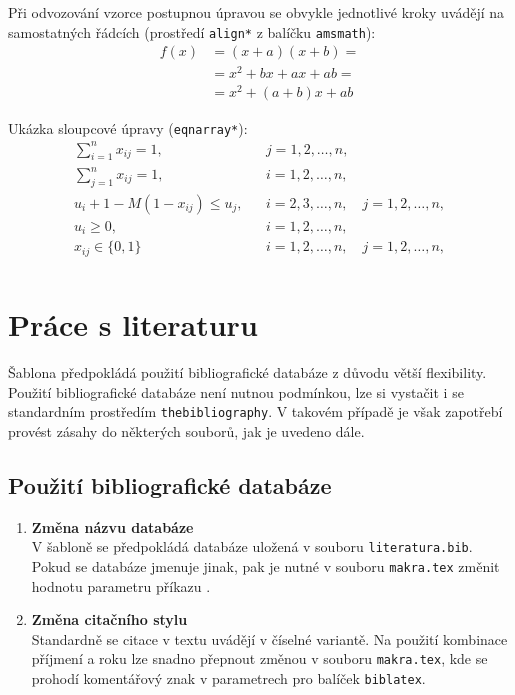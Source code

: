 Při odvozování vzorce postupnou úpravou se obvykle jednotlivé kroky uvádějí na samostatných řádcích (prostředí \verb'align*' z balíčku \verb|amsmath|):
\begin{align*}
 f(x) &= (x+a)(x+b) =\\
      &= x^2 + bx + ax + ab =\\
      &= x^2 + (a+b)x + ab
\end{align*}

Ukázka sloupcové úpravy (\verb|eqnarray*|):
\begin{eqnarray*}
\sum_{i=1}^n x_{ij} =1, && j=1,2,\dots,n,\\
\sum_{j=1}^n x_{ij} =1, && i=1,2,\dots,n,\\
u_i + 1 - M(1 - x_{ij}) \le u_j, && i=2,3,\dots,n,\quad j=1,2,\dots,n,\\
u_i \ge 0,              && i=1,2,\dots,n,\\
x_{ij} \in \{0,1\} && i=1,2,\dots,n,\quad j=1,2,\dots,n,\\
\end{eqnarray*}


\chapter{Práce s literaturu}

Šablona předpokládá použití bibliografické databáze z důvodu větší flexibility. Použití bibliografické databáze není nutnou podmínkou, lze si vystačit i se standardním prostředím \texttt{thebibliography}. V takovém případě je však zapotřebí provést zásahy do některých souborů, jak je uvedeno dále.

\section{Použití bibliografické databáze}

\begin{enumerate}
\item\textbf{Změna názvu databáze}\\
V šabloně se předpokládá databáze uložená v souboru \texttt{literatura.bib}. Pokud se databáze jmenuje jinak, pak je nutné v souboru \texttt{makra.tex} změnit hodnotu parametru příkazu \verb''.
\item\textbf{Změna citačního stylu}\\
Standardně se citace v textu uvádějí v číselné variantě. Na použití kombinace příjmení a roku lze snadno přepnout změnou v souboru \texttt{makra.tex}, kde se prohodí komentářový znak v parametrech pro balíček \texttt{biblatex}.
\end{enumerate}


